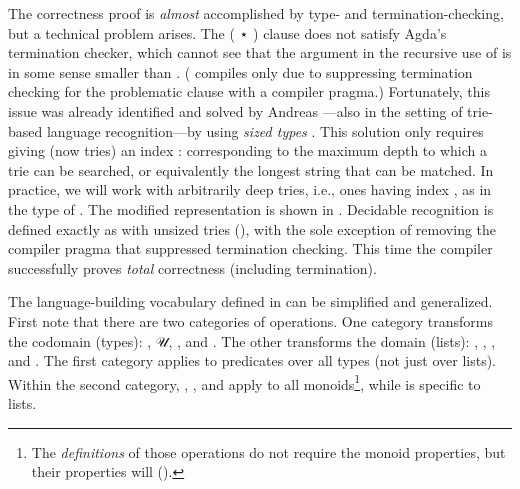 \documentclass[acmsmall,screen,anonymous,timestamp]{acmart}
\begin{document}
The correctness proof is \emph{almost} accomplished by type- and termination-checking, but a technical problem arises.
The { ( \AF ⋆ )} clause does not satisfy Agda's termination checker, which cannot see that the argument {  } in the recursive use of  is in some sense smaller than .
( compiles only due to suppressing termination checking for the problematic clause with a compiler pragma.)
Fortunately, this issue was already identified and solved by Andreas \citet{Abel2016}---also in the setting of trie-based language recognition---by using \emph{sized types} \citep{Abel2008, AbelPientka2016}.
\rnc{}
This solution only requires giving  (now tries) an index { \AK : } corresponding to the maximum depth to which a trie can be searched, or equivalently the longest string that can be matched.
In practice, we will work with arbitrarily deep tries, i.e., ones having index , as in the type of {}.
The modified representation is shown in .
Decidable recognition is defined exactly as with unsized tries (), with the sole exception of removing the compiler pragma that suppressed termination checking.
This time the compiler successfully proves \emph{total} correctness (including termination).



\rnc{}

The language-building vocabulary defined in  can be simplified and generalized.
First note that there are two categories of operations.
One category transforms the codomain (types): , \AF 𝒰, , and .
The other transforms the domain (lists): , , , and .
The first category applies to predicates over all types (not just over lists).
Within the second category, , , and  apply to all monoids\footnote{The \emph{definitions} of those operations do not require the monoid properties, but their properties will ().}, while  is specific to lists.
\end{document}
